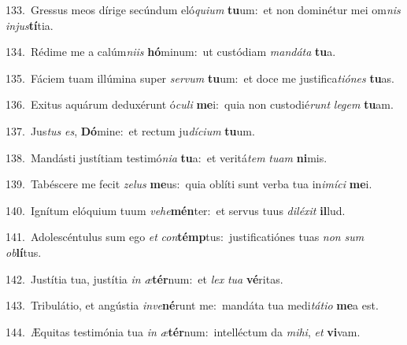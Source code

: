 {\numbfont\textcolor{\numbcolor}{133.}}~Gressus meos dírige secúndum eló\-\textit{qui}\-\textit{um} \textbf{tu}\-um:~\star et non dominétur mei om\textit{nis} \textit{in}\-\textit{jus}\textbf{tí}tia.\par
{\numbfont\textcolor{\numbcolor}{134.}}~Rédime me a calúm\-\textit{ni}\-\textit{is} \textbf{hó}\-minum:~\star ut custódiam \textit{man}\-\textit{dá}\textit{ta} \textbf{tu}\-a.\par
{\numbfont\textcolor{\numbcolor}{135.}}~Fáciem tuam illúmina super \textit{ser}\-\textit{vum} \textbf{tu}\-um:~\star et doce me justifica\-\textit{ti}\-\textit{ó}\textit{nes} \textbf{tu}\-as.\par
{\numbfont\textcolor{\numbcolor}{136.}}~Exitus aquárum deduxérunt ó\-\textit{cu}\-\textit{li} \textbf{me}\-i:~\star quia non custodié\textit{runt} \textit{le}\-\textit{gem} \textbf{tu}\-am.\par
{\numbfont\textcolor{\numbcolor}{137.}}~Jus\textit{tus} \textit{es}\-, \textbf{Dó}\-mine:~\star et rectum ju\-\textit{dí}\-\textit{ci}\textit{um} \textbf{tu}\-um.\par
{\numbfont\textcolor{\numbcolor}{138.}}~Mandásti justítiam testimó\-\textit{ni}\-\textit{a} \textbf{tu}\-a:~\star et veritá\textit{tem} \textit{tu}\-\textit{am} \textbf{ni}\-mis.\par
{\numbfont\textcolor{\numbcolor}{139.}}~Tabéscere me fecit \textit{ze}\-\textit{lus} \textbf{me}\-us:~\star quia oblíti sunt verba tua in\-\textit{i}\-\textit{mí}\textit{ci} \textbf{me}\-i.\par
{\numbfont\textcolor{\numbcolor}{140.}}~Ignítum elóquium tuum \textit{ve}\-\textit{he}\textbf{mén}ter:~\star et servus tuus \textit{di}\-\textit{lé}\textit{xit} \textbf{il}\-lud.\par
{\numbfont\textcolor{\numbcolor}{141.}}~Adolescéntulus sum ego \textit{et} \textit{con}\-\textbf{témp}tus:~\star justificatiónes tuas \textit{non} \textit{sum} \textit{ob}\-\textbf{lí}tus.\par
{\numbfont\textcolor{\numbcolor}{142.}}~Justítia tua, justítia \textit{in} \textit{æ}\-\textbf{tér}num:~\star et \textit{lex} \textit{tu}\-\textit{a} \textbf{vé}\-ritas.\par
{\numbfont\textcolor{\numbcolor}{143.}}~Tribulátio, et angústia \textit{in}\-\textit{ve}\textbf{né}runt me:~\star mandáta tua medi\-\textit{tá}\-\textit{ti}\textit{o} \textbf{me}\-a est.\par
{\numbfont\textcolor{\numbcolor}{144.}}~Æquitas testimónia tua \textit{in} \textit{æ}\-\textbf{tér}num:~\star intelléctum da \textit{mi}\-\textit{hi}, \textit{et} \textbf{vi}\-vam.\par
